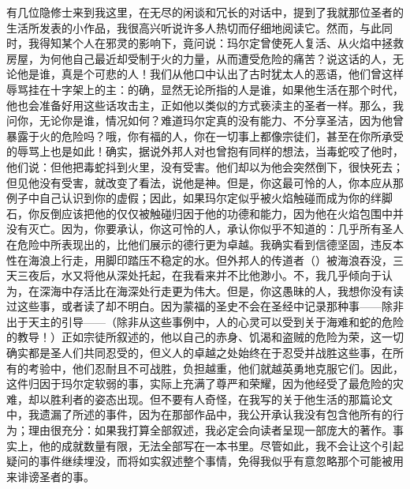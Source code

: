 有几位隐修士来到我这里，在无尽的闲谈和冗长的对话中，提到了我就那位圣者的生活所发表的小作品，我很高兴听说许多人热切而仔细地阅读它。然而，与此同时，我得知某个人在邪灵的影响下，竟问说：玛尔定曾使死人复活、从火焰中拯救房屋，为何他自己最近却受制于火的力量，从而遭受危险的痛苦？说这话的人，无论他是谁，真是个可悲的人！我们从他口中认出了古时犹太人的恶语，他们曾这样辱骂挂在十字架上的主：的确，显然无论所指的人是谁，如果他生活在那个时代，他也会准备好用这些话攻击主，正如他以类似的方式亵渎主的圣者一样。那么，我问你，无论你是谁，情况如何？难道玛尔定真的没有能力、不分享圣洁，因为他曾暴露于火的危险吗？哦，你有福的人，你在一切事上都像宗徒们，甚至在你所承受的辱骂上也是如此！确实，据说外邦人对也曾抱有同样的想法，当毒蛇咬了他时，他们说：但他把毒蛇抖到火里，没有受害。他们却以为他会突然倒下，很快死去；但见他没有受害，就改变了看法，说他是神。但是，你这最可怜的人，你本应从那例子中自己认识到你的虚假；因此，如果玛尔定似乎被火焰触碰而成为你的绊脚石，你反倒应该把他的仅仅被触碰归因于他的功德和能力，因为他在火焰包围中并没有灭亡。因为，你要承认，你这可怜的人，承认你似乎不知道的：几乎所有圣人在危险中所表现出的，比他们展示的德行更为卓越。我确实看到信德坚固，违反本性在海浪上行走，用脚印踏压不稳定的水。但外邦人的传道者（）被海浪吞没，三天三夜后，水又将他从深处托起，在我看来并不比他渺小。不，我几乎倾向于认为，在深海中存活比在海深处行走更为伟大。但是，你这愚昧的人，我想你没有读过这些事，或者读了却不明白。因为蒙福的圣史不会在圣经中记录那种事——除非出于天主的引导——（除非从这些事例中，人的心灵可以受到关于海难和蛇的危险的教导！）正如宗徒所叙述的，他以自己的赤身、饥渴和盗贼的危险为荣，这一切确实都是圣人们共同忍受的，但义人的卓越之处始终在于忍受并战胜这些事，在所有的考验中，他们忍耐且不可战胜，负担越重，他们就越英勇地克服它们。因此，这件归因于玛尔定软弱的事，实际上充满了尊严和荣耀，因为他经受了最危险的灾难，却以胜利者的姿态出现。但不要有人奇怪，在我写的关于他生活的那篇论文中，我遗漏了所述的事件，因为在那部作品中，我公开承认我没有包含他所有的行为；理由很充分：如果我打算全部叙述，我必定会向读者呈现一部庞大的著作。事实上，他的成就数量有限，无法全部写在一本书里。尽管如此，我不会让这个引起疑问的事件继续埋没，而将如实叙述整个事情，免得我似乎有意忽略那个可能被用来诽谤圣者的事。\par

